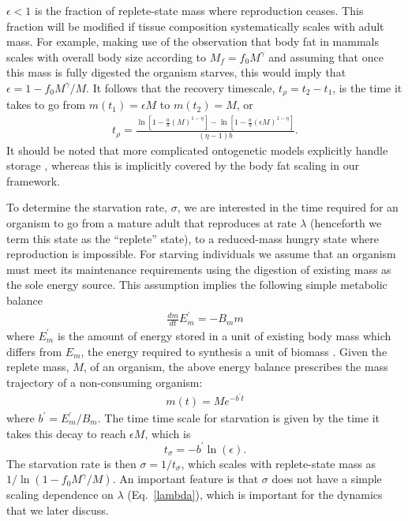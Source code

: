 \documentclass{pnastwo}
\begin{document}
\begin{article}
$\epsilon<1$ is the fraction of replete-state mass where reproduction ceases. This fraction will be modified if tissue composition systematically scales
with adult mass.  For example, making use of the observation that body fat in
mammals scales with overall body size according to $M_{f}=f_{0}M^{\gamma}$
and assuming that once this mass is fully digested the organism starves, this
would imply that $\epsilon=1-f_{0}M^{\gamma}/M$. It follows that the recovery timescale, $t_{\rho}=t_{2}-t_{1}$, is the time it takes
to go from $m\left(t_{1}\right)=\epsilon M$ to $m\left(t_{2}\right)=M$, or
\begin{eqnarray}
t_{\rho}=\frac{\ln\left[1\!-\!\frac{a}{b}\left(M
  \right)^{1\!-\!\eta }\right]
-\ln \left[1\!-\!\frac{a}{b}\left(\epsilon M \right)^{1\!-\!\eta }\right]}{(\eta -1) b}.
\end{eqnarray}
It should be noted that more complicated ontogenetic models explicitly handle storage \cite{hou}, whereas this is implicitly covered by the body fat scaling in our framework.

To determine the starvation rate, $\sigma$, we are interested in the time
required for an organism to go from a mature adult that reproduces at rate
$\lambda$ (henceforth we term this state as the ``replete'' state), to a
reduced-mass hungry state where reproduction is impossible.  For starving individuals we assume that an organism must meet its maintenance requirements using the digestion of existing mass as the sole energy source.
This assumption implies the following simple metabolic balance 
\begin{eqnarray}
\frac{dm}{dt}E_{m}^{\prime}=-B_{m}m
\end{eqnarray}
where $E_{m}^{\prime}$ is the amount of energy stored in a unit of existing
body mass which differs from $E_{m}$, the energy required to
synthesis a unit of biomass \cite{hou}. Given the replete mass, $M$, of an organism, the
above energy balance prescribes the mass trajectory of a non-consuming
organism:
\begin{eqnarray}
\label{mt}
m\left(t\right)=Me^{-b^{\prime}t}
\end{eqnarray}
where $b^{\prime}=E_{m}^{\prime}/B_{m}$. The time time scale for starvation is given by the time it takes this decay to reach $\epsilon M$, which is
\begin{equation}
\label{eq:sigma}
t_{\sigma}=-b^{\prime}\ln\left(\epsilon\right).
\end{equation}
The starvation rate is then $\sigma=1/t_{\sigma}$, which scales with
replete-state mass as $1/\ln\left(1-f_{0}M^{\gamma}/M\right)$.  An important
feature is that $\sigma$ does not have a simple scaling dependence on
$\lambda$ (Eq.~\ref{lambda}), which is important for the dynamics that we
later discuss.


\end{article}
\end{document}
